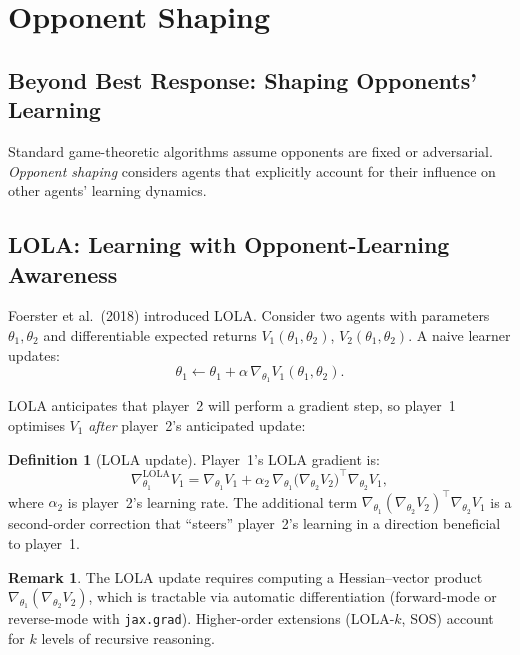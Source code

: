 \documentclass[11pt,a4paper]{article}
\theoremstyle{plain}
\theoremstyle{definition}
\newtheorem{definition}[theorem]{Definition}
\newtheorem{remark}[theorem]{Remark}
\begin{document}
\section{Opponent Shaping}\label{sec:opponent_shaping}

\subsection{Beyond Best Response: Shaping Opponents' Learning}

Standard game-theoretic algorithms assume opponents are fixed or
adversarial.  \emph{Opponent shaping} considers agents that explicitly
account for their influence on other agents' learning dynamics.

\subsection{LOLA: Learning with Opponent-Learning Awareness}

Foerster et al.\ (2018) introduced LOLA.  Consider two agents with
parameters $\theta_1, \theta_2$ and differentiable expected returns
$V_1(\theta_1, \theta_2)$, $V_2(\theta_1, \theta_2)$.  A naive learner
updates:
\[
  \theta_1 \gets \theta_1 + \alpha\,\nabla_{\theta_1} V_1(\theta_1, \theta_2).
\]

LOLA anticipates that player~2 will perform a gradient step, so
player~1 optimises $V_1$ \emph{after} player~2's anticipated update:

\begin{definition}[LOLA update]
Player~1's LOLA gradient is:
\[
  \nabla_{\theta_1}^{\text{LOLA}} V_1
  = \nabla_{\theta_1} V_1
  + \alpha_2\, \nabla_{\theta_1}\bigl(\nabla_{\theta_2} V_2\bigr)^\top
    \nabla_{\theta_2} V_1,
\]
where $\alpha_2$ is player~2's learning rate.  The additional term
$\nabla_{\theta_1}(\nabla_{\theta_2} V_2)^\top \nabla_{\theta_2} V_1$
is a second-order correction that ``steers'' player~2's learning in a
direction beneficial to player~1.
\end{definition}

\begin{remark}
The LOLA update requires computing a Hessian--vector product
$\nabla_{\theta_1}(\nabla_{\theta_2} V_2)$, which is tractable via
automatic differentiation (forward-mode or reverse-mode with
\texttt{jax.grad}).  Higher-order extensions (LOLA-$k$, SOS) account for
$k$ levels of recursive reasoning.
\end{remark}
\end{document}
